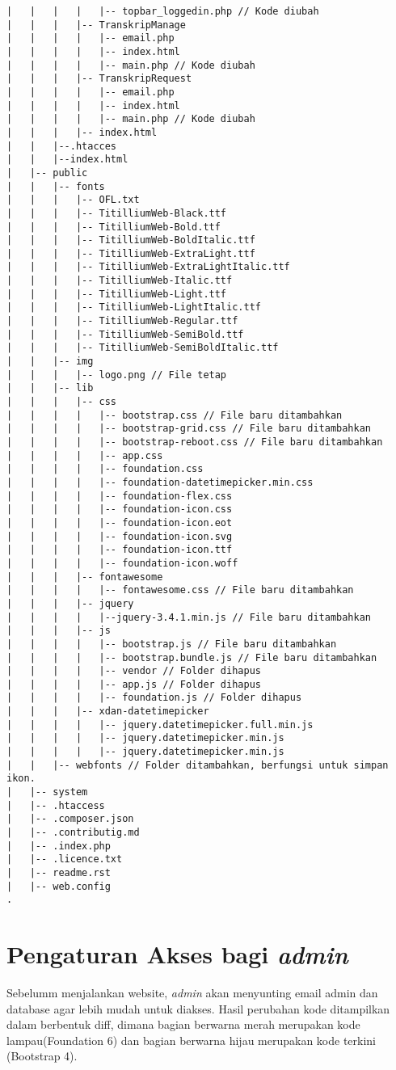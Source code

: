 \begin{lstlisting}[basicstyle=\ttfamily, frame=single, caption=Perubahan isi folder BlueTape,
columns=fullflexible, keepspaces=true, breaklines=true, label={lst:daftarfile}]
|   |   |   |   |-- topbar_loggedin.php // Kode diubah
|   |   |   |-- TranskripManage
|   |   |   |   |-- email.php
|   |   |   |   |-- index.html
|   |   |   |   |-- main.php // Kode diubah
|   |   |   |-- TranskripRequest
|   |   |   |   |-- email.php
|   |   |   |   |-- index.html
|   |   |   |   |-- main.php // Kode diubah
|   |   |   |-- index.html
|   |   |--.htacces
|   |   |--index.html
|   |-- public
|   |   |-- fonts
|   |   |   |-- OFL.txt
|   |   |   |-- TitilliumWeb-Black.ttf
|   |   |   |-- TitilliumWeb-Bold.ttf
|   |   |   |-- TitilliumWeb-BoldItalic.ttf
|   |   |   |-- TitilliumWeb-ExtraLight.ttf
|   |   |   |-- TitilliumWeb-ExtraLightItalic.ttf
|   |   |   |-- TitilliumWeb-Italic.ttf
|   |   |   |-- TitilliumWeb-Light.ttf
|   |   |   |-- TitilliumWeb-LightItalic.ttf
|   |   |   |-- TitilliumWeb-Regular.ttf
|   |   |   |-- TitilliumWeb-SemiBold.ttf
|   |   |   |-- TitilliumWeb-SemiBoldItalic.ttf
|   |   |-- img
|   |   |   |-- logo.png // File tetap
|   |   |-- lib 
|   |   |   |-- css
|   |   |   |   |-- bootstrap.css // File baru ditambahkan
|   |   |   |   |-- bootstrap-grid.css // File baru ditambahkan
|   |   |   |   |-- bootstrap-reboot.css // File baru ditambahkan
|   |   |   |   |-- app.css 
|   |   |   |   |-- foundation.css 
|   |   |   |   |-- foundation-datetimepicker.min.css 
|   |   |   |   |-- foundation-flex.css 
|   |   |   |   |-- foundation-icon.css 
|   |   |   |   |-- foundation-icon.eot 
|   |   |   |   |-- foundation-icon.svg 
|   |   |   |   |-- foundation-icon.ttf 
|   |   |   |   |-- foundation-icon.woff 
|   |   |   |-- fontawesome
|   |   |   |   |-- fontawesome.css // File baru ditambahkan
|   |   |   |-- jquery
|   |   |   |   |--jquery-3.4.1.min.js // File baru ditambahkan
|   |   |   |-- js
|   |   |   |   |-- bootstrap.js // File baru ditambahkan
|   |   |   |   |-- bootstrap.bundle.js // File baru ditambahkan
|   |   |   |   |-- vendor // Folder dihapus
|   |   |   |   |-- app.js // Folder dihapus
|   |   |   |   |-- foundation.js // Folder dihapus
|   |   |   |-- xdan-datetimepicker 
|   |   |   |   |-- jquery.datetimepicker.full.min.js
|   |   |   |   |-- jquery.datetimepicker.min.js
|   |   |   |   |-- jquery.datetimepicker.min.js
|   |   |-- webfonts // Folder ditambahkan, berfungsi untuk simpan ikon.
|   |-- system
|   |-- .htaccess
|   |-- .composer.json
|   |-- .contributig.md
|   |-- .index.php
|   |-- .licence.txt
|   |-- readme.rst
|   |-- web.config
.
\end{lstlisting}

\section{Pengaturan Akses bagi \textit{admin}}
Sebelumm menjalankan website, \textit{admin} akan menyunting email admin dan database agar lebih mudah untuk diakses. Hasil perubahan kode ditampilkan dalam berbentuk diff, dimana bagian berwarna merah merupakan kode lampau(Foundation 6) dan bagian berwarna hijau merupakan kode terkini  (Bootstrap 4).

